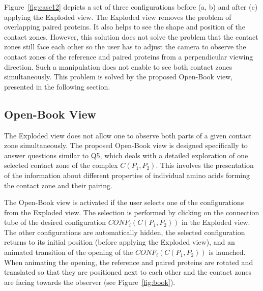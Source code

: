 \documentclass{bmcart}
\def\OpBook {Open-Book view\xspace}
\def\ExpView {Exploded view\xspace}
\begin{document}
Figure~\ref{fig:case12} depicts a set of three configurations before (a, b) and after (c) applying the \ExpView.
The Exploded view removes the problem of overlapping paired proteins.
It also helps to see the shape and position of the contact zones.
However, this solution does not solve the problem that the contact zones still face each other so the user has to adjust the camera to observe the contact zones of the reference and paired proteins from a perpendicular viewing direction. 
Such a manipulation does not enable to see both contact zones simultaneously.
This problem is solved by the proposed \OpBook, presented in the following section.



\subsection*{Open-Book View}
The \ExpView does not allow one to observe both parts of a given contact zone simultaneously.
The proposed \OpBook is designed specifically to answer questions similar to Q5, which deals with a detailed exploration of one selected contact zone of the complex $C(P_1,P_2)$.
This involves the presentation of the information about different properties of individual amino acids forming the contact zone and their pairing.

The \OpBook is activated if the user selects one of the configurations from the \ExpView. 
The selection is performed by clicking on the connection tube of the desired configuration $CONF_i(C(P_1,P_2))$ in the \ExpView.
The other configurations are automatically hidden, the selected configuration returns to its initial position (before applying the \ExpView), and an animated transition of the opening of the $CONF_i(C(P_1,P_2))$ is launched.
When animating the opening, the reference and paired proteins are rotated and translated so that they are positioned next to each other and the contact zones are facing towards the observer (see Figure~\ref{fig:book}). 
\end{document}
